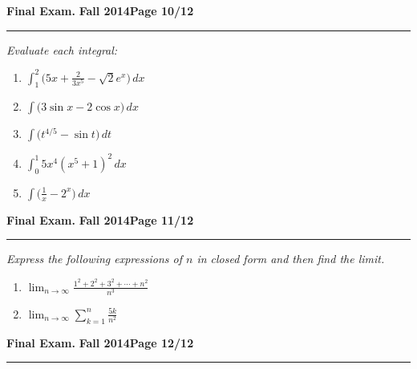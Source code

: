 \documentclass[12pt]{article}
\begin{document}
{%
\hfill{\large\bf Final Exam.}\hfill{\large\bf
  Fall 2014}\hfill{\large\bf Page 10/12}\hrule

\bigskip
{\problem[25 pts] \em  Evaluate each integral:} 
\begin{enumerate}
\item $\displaystyle{\int_1^2 \big( 5x + \frac{2}{3x^5} - \sqrt{2} e^x \big)\, dx}$
\vspace{3cm}
\item $\displaystyle{\int \big( 3\sin x - 2\cos x \big)\, dx}$
\vspace{3cm}
\item $\displaystyle{\int \big( t^{4/5} - \sin t\big)\, dt}$
\vspace{3cm}
\item $\displaystyle{\int_0^1 5x^4 (x^5+1)^2\, dx}$
\vspace{3cm}
\item $\displaystyle{\int \big( \tfrac{1}{x} - 2^x \big)\, dx}$

\end{enumerate}
\newpage

\hfill{\large\bf Final Exam.}\hfill{\large\bf
  Fall 2014}\hfill{\large\bf Page 11/12}\hrule

\bigskip
{\problem[30 pts] \em Express the following expressions of $n$ in closed
  form and then find the limit.}
\begin{enumerate}
\item  $\displaystyle{\lim_{n \to \infty} \frac{1^2+2^2+3^2+ \dotsb +
      n^2}{n^3}}$
\vspace{9cm}
\item  $\displaystyle{\lim_{n \to \infty} \sum_{k=1}^n \frac{5k}{n^2}}$
\vspace{9cm}
\end{enumerate}
\newpage

\hfill{\large\bf Final Exam.}\hfill{\large\bf
  Fall 2014}\hfill{\large\bf Page 12/12}\hrule

}
\end{document}

